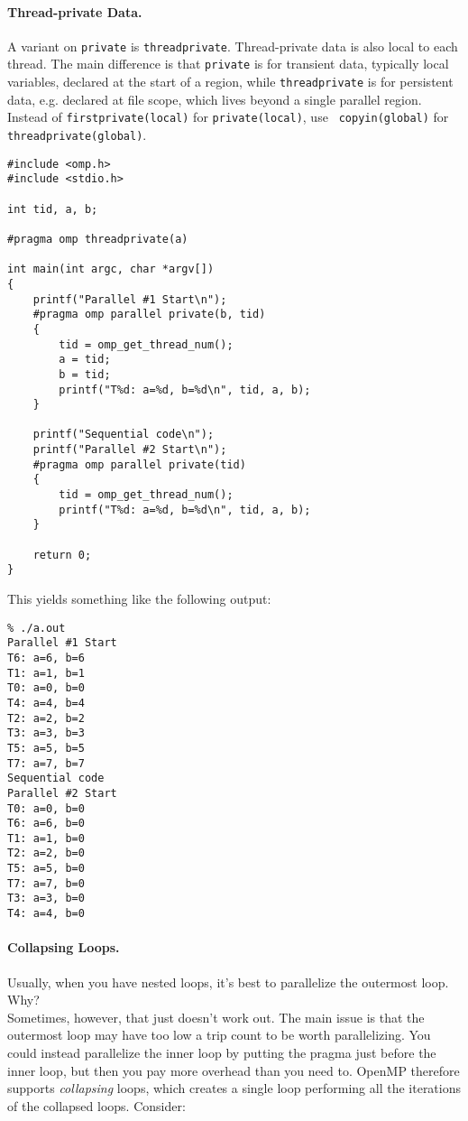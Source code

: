 \paragraph{Thread-private Data.} A variant on {\tt private} is
{\tt threadprivate}. Thread-private data is also local to each
thread. The main difference is that {\tt private} is for transient
data, typically local variables, declared at the start of a region,
while {\tt threadprivate} is for persistent data, e.g. declared at
file scope, which lives beyond a single parallel region. Instead of
{\tt firstprivate(local)} for {\tt private(local)}, use {\tt
  copyin(global)} for {\tt threadprivate(global)}.

\begin{verbatim}
#include <omp.h>
#include <stdio.h>

int tid, a, b;

#pragma omp threadprivate(a)

int main(int argc, char *argv[])
{
    printf("Parallel #1 Start\n");
    #pragma omp parallel private(b, tid)
    {
        tid = omp_get_thread_num();
        a = tid;
        b = tid;
        printf("T%d: a=%d, b=%d\n", tid, a, b);
    }

    printf("Sequential code\n");
    printf("Parallel #2 Start\n");
    #pragma omp parallel private(tid)
    {
        tid = omp_get_thread_num();
        printf("T%d: a=%d, b=%d\n", tid, a, b);
    }

    return 0;
}    
  \end{verbatim}
This yields something like the following output:
\begin{verbatim}
% ./a.out
Parallel #1 Start
T6: a=6, b=6
T1: a=1, b=1
T0: a=0, b=0
T4: a=4, b=4
T2: a=2, b=2
T3: a=3, b=3
T5: a=5, b=5
T7: a=7, b=7
Sequential code
Parallel #2 Start
T0: a=0, b=0
T6: a=6, b=0
T1: a=1, b=0
T2: a=2, b=0
T5: a=5, b=0
T7: a=7, b=0
T3: a=3, b=0
T4: a=4, b=0
\end{verbatim}

\paragraph{Collapsing Loops.}
Usually, when you have nested loops, it's best to parallelize the
outermost loop. {\sf Why?} \\[2em]

Sometimes, however, that just doesn't work out. The main issue is that
the outermost loop may have too low a trip count to be worth
parallelizing. You could instead parallelize the inner loop by putting
the pragma just before the inner loop, but then you pay more overhead
than you need to. OpenMP therefore supports \emph{collapsing} loops,
which creates a single loop performing all the iterations of the
collapsed loops. Consider:

